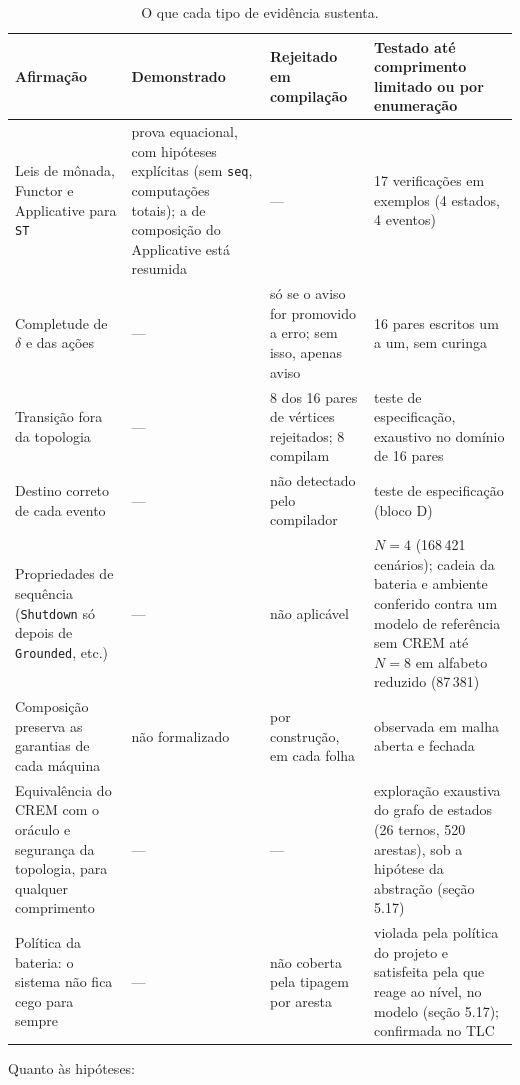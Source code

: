 \documentclass[12pt,a4paper]{article}
\begin{document}
\begin{table}[h]
\centering
\footnotesize
\begin{tabular}{|p{3.0cm}|p{3.4cm}|p{3.4cm}|p{4.0cm}|}
\hline
Afirmação & Demonstrado & Rejeitado em compilação & Testado até comprimento limitado ou por enumeração \\
\hline
Leis de mônada, Functor e Applicative para \texttt{ST} & prova equacional, com hipóteses explícitas (sem \texttt{seq}, computações totais); a de composição do Applicative está resumida & --- & 17 verificações em exemplos (4 estados, 4 eventos) \\
\hline
Completude de $\delta$ e das ações & --- & só se o aviso for promovido a erro; sem isso, apenas aviso & 16 pares escritos um a um, sem curinga \\
\hline
Transição fora da topologia & --- & 8 dos 16 pares de vértices rejeitados; 8 compilam & teste de especificação, exaustivo no domínio de 16 pares \\
\hline
Destino correto de cada evento & --- & não detectado pelo compilador & teste de especificação (bloco D) \\
\hline
Propriedades de sequência (\texttt{Shutdown} só depois de \texttt{Grounded}, etc.) & --- & não aplicável & $N = 4$ (168\,421 cenários); cadeia da bateria e ambiente conferido contra um modelo de referência sem CREM até $N = 8$ em alfabeto reduzido (87\,381) \\
\hline
Composição preserva as garantias de cada máquina & não formalizado & por construção, em cada folha & observada em malha aberta e fechada \\
\hline
Equivalência do CREM com o oráculo e segurança da topologia, para qualquer comprimento & --- & --- & exploração exaustiva do grafo de estados (26 ternos, 520 arestas), sob a hipótese da abstração (seção 5.17) \\
\hline
Política da bateria: o sistema não fica cego para sempre & --- & não coberta pela tipagem por aresta & violada pela política do projeto e satisfeita pela que reage ao nível, no modelo (seção 5.17); confirmada no TLC \\
\hline
\end{tabular}
\caption{O que cada tipo de evidência sustenta.}
\label{tab:evidencia}
\end{table}

Quanto às hipóteses:
\end{document}
